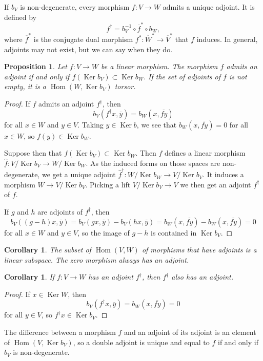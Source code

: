 \documentclass[10pt,a4paper]{article}
\newtheorem{prop}[theo]{Proposition}
\newtheorem{coro}[theo]{Corollary}
\newtheorem*{proof}{Proof}
\def\ov#1{\overline{#1}}
\DeclareMathOperator{\Ker}{Ker}
\DeclareMathOperator{\Hom}{Hom}
\begin{document}
If $b_V$ is non-degenerate, every morphism $f : V \to W$ admits a unique adjoint. It is defined by
\[
f^\dagger = b_V^{-1} \circ \ov f^* \circ b_W,
\]
where $\ov f^*$ is the conjugate dual morphism $f^* : \ov W^* \to \ov V^*$ that $f$ induces. In general, adjoints may not exist, but we can say when they do.


\begin{prop}
Let $f : V \to W$ be a linear morphism. The morphism $f$ admits an adjoint if and only if $f(\Ker b_V) \subset \Ker b_W$. If the set of adjoints of $f$ is not empty, it is a $\Hom(W, \Ker b_V)$ torsor.
\end{prop}

\begin{proof}
If $f$ admits an adjoint $f^\dagger$, then
\[
b_V(f^\dagger x, \ov y)
= b_W(x, \ov{fy})
\]
for all $x \in W$ and $y \in V$. Taking $y \in \Ker b$, we see that $b_W(x, \ov{fy}) = 0$ for all $x \in W$, so $f(y) \in \Ker b_W$.

Suppose then that $f(\Ker b_V) \subset \Ker b_W$. Then $f$ defines a linear morphism $\hat f : V / \Ker b_V \to W / \Ker b_W$. As the induced forms on those spaces are non-degenerate, we get a unique adjoint $\hat f^\dagger : W / \Ker b_W \to V / \Ker b_V$. It induces a morphism $W \to V / \Ker b_V$. Picking a lift $V / \Ker b_V \to V$ we then get an adjoint $f^\dagger$ of $f$.

If $g$ and $h$ are adjoints of $f^\dagger$, then
\[
b_V((g - h)x, \ov y)
= b_V(gx, \ov y) - b_V(hx, \ov y)
= b_W(x, \ov{fy}) - b_W(x, \ov{fy})
= 0
\]
for all $x \in W$ and $y \in V$, so the image of $g - h$ is contained in $\Ker b_V$.
\end{proof}


\begin{coro}
The subset of $\Hom(V,W)$ of morphisms that have adjoints is a linear subspace.  The zero morphism always has an adjoint.
\end{coro}



\begin{coro}
If $f : V \to W$ has an adjoint $f^\dagger$, then $f^\dagger$ also has an adjoint.
\end{coro}

\begin{proof}
If $x \in \Ker W$, then
\[
b_V(f^\dagger x, \ov y)
= b_W(x, \ov{fy})
= 0
\]
for all $y \in V$, so $f^\dagger x \in \Ker b_V$.
\end{proof}

The difference between a morphism $f$ and an adjoint of its adjoint is an element of $\Hom(V, \Ker b_V)$, so a double adjoint is unique and equal to $f$ if and only if $b_V$ is non-degenerate.
\end{document}
